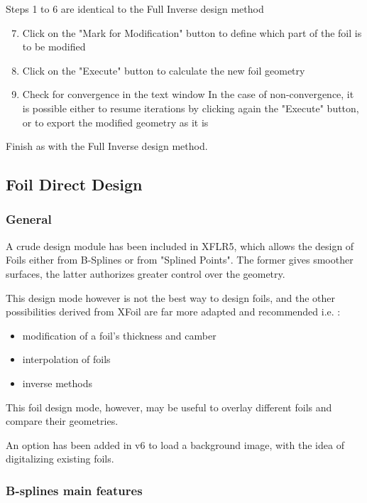 \documentclass[a4paper,twoside,12pt,dvips]{article}
\begin{document}
Steps 1 to 6 are identical to the Full Inverse design method

\begin{enumerate}
\setcounter{enumi}{6}
\item Click on the "Mark for Modification" button to define which
part of the foil is to be modified
\item Click on the "Execute" button to calculate the new foil
geometry
\item Check for convergence in the text window\newline
In the case of non-convergence, it is possible either to resume
iterations by clicking again the "Execute" button, or to export the
modified geometry as it is
\end{enumerate}

Finish as with the Full Inverse design method.

\subsection{Foil Direct Design}

\subsubsection{General}

A crude design module has been included in XFLR5, which allows the
design of Foils either from B-Splines or from "Splined Points". The
former gives smoother surfaces, the latter authorizes greater control
over the geometry.

This design mode however is not the best way to design foils, and the
other possibilities derived from XFoil are far more adapted and
recommended i.e. :

\begin{itemize}
\item modification of a foil's thickness and camber
\item interpolation of foils
\item inverse methods
\end{itemize}

This foil design mode, however, may be useful to overlay different
foils and compare their geometries.

An option has been added in v6 to load a background image, with the
idea of digitalizing existing foils.

\subsubsection{B-splines main features}
\end{document}
